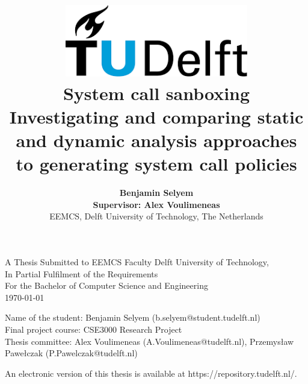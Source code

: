 \title{
    \includegraphics[width=8cm, keepaspectratio]{tudelftlogo.png}\\
    \vspace*{2cm}
    \textbf{
        System call sanboxing\\
        {\large Investigating and comparing static and dynamic analysis approaches to generating system call policies}
    }\\
    \vspace*{1cm}
}

\author{
    \textbf{
Benjamin Selyem}\\
    \hfill \break
    \textbf{Supervisor: Alex Voulimeneas}\\
    \break
    {\large 
        \hfill \break
        EEMCS, Delft University of Technology, The Netherlands
    }\\
}

\date{}

\maketitle
\thispagestyle{empty}

\let\clearpagebackup\clearpage
\renewcommand{\clearpage}{ }

\onecolumn

\vspace*{1.5cm}
\begin{center}
    A Thesis Submitted to EEMCS Faculty Delft University of Technology,\\
    In Partial Fulfilment of the Requirements\\
    For the Bachelor of Computer Science and Engineering\\
    \today
\end{center}

\vspace*{2cm}

\noindent
{\small
Name of the student: Benjamin Selyem (b.selyem@student.tudelft.nl)\\
Final project course: CSE3000 Research Project\\
Thesis committee: Alex Voulimeneas (A.Voulimeneas@tudelft.nl), Przemysław Pawełczak (P.Pawelczak@tudelft.nl)\\
}
\vfill

\begin{center}
    An electronic version of this thesis is available at https://repository.tudelft.nl/.
\end{center}

\twocolumn
\let\clearpage\clearpagebackup  
\clearpage
\setcounter{page}{1}
